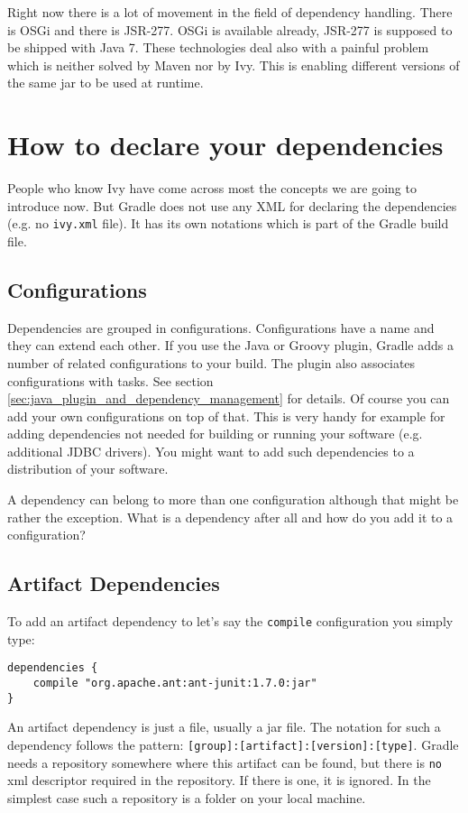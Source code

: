 Right now there is a lot of movement in the field of dependency handling. There is OSGi and there is JSR-277. OSGi is available already, JSR-277 is supposed to be shipped with Java 7. These technologies deal also with a painful problem which is neither solved by Maven nor by Ivy. This is enabling different versions of the same jar to be used at runtime.

\section{How to declare your dependencies} %
\label{sec:how_to_declare_your_dependencies}
People who know Ivy have come across most the concepts we are going to introduce now. But Gradle does not use any XML for declaring the dependencies (e.g. no \texttt{ivy.xml} file). It has its own notations which is part of the Gradle build file.

\subsection{Configurations} %
\label{sub:configurations}
Dependencies are grouped in configurations. Configurations have a name and they can extend each other. If you use the Java or Groovy plugin, Gradle adds a number of related configurations to your build. The plugin also associates configurations with tasks. See section \ref{sec:java_plugin_and_dependency_management} for details. Of course you can add your own configurations on top of that. This is very handy for example for adding dependencies not needed for building or running your software (e.g. additional JDBC drivers). You might want to add such dependencies to a distribution of your software.

A dependency can belong to more than one configuration although that might be rather the exception. What is a dependency after all and how do you add it to a configuration? 

\subsection{Artifact Dependencies} %
\label{sub:artifact_dependencies}
To add an artifact dependency to let's say the \texttt{compile} configuration you simply type:
\begin{Verbatim}
dependencies {
	compile "org.apache.ant:ant-junit:1.7.0:jar"
}
\end{Verbatim}
An artifact dependency is just a file, usually a jar file. The notation for such a dependency follows the  pattern: \texttt{[group]:[artifact]:[version]:[type]}. Gradle needs a repository somewhere where this artifact can be found, but there is \texttt{no} xml descriptor required in the repository. If there is one, it is ignored. In the simplest case such a repository is a folder on your local machine.

